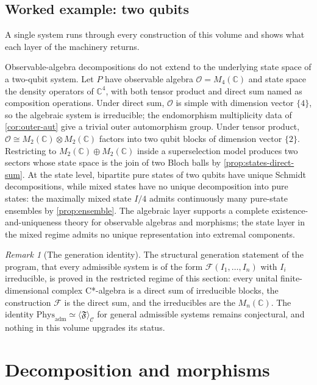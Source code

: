 \documentclass[11pt,letterpaper]{article}
\theoremstyle{definition}
\theoremstyle{remark}
\newtheorem{remark}[theorem]{Remark}
\begin{document}
\subsection{Worked example: two qubits}

A single system runs through every construction of this volume and shows what each layer of the machinery returns.

Observable-algebra decompositions do not extend to the underlying state space of a two-qubit system. Let $P$ have observable algebra $\mathcal{O} = M_4(\mathbb{C})$ and state space the density operators of $\mathbb{C}^4$, with both tensor product and direct sum named as composition operations. Under direct sum, $\mathcal{O}$ is simple with dimension vector $\{4\}$, so the algebraic system is irreducible; the endomorphism multiplicity data of \cref{cor:outer-aut} give a trivial outer automorphism group. Under tensor product, $\mathcal{O} \cong M_2(\mathbb{C}) \otimes M_2(\mathbb{C})$ factors into two qubit blocks of dimension vector $\{2\}$. Restricting to $M_2(\mathbb{C}) \oplus M_2(\mathbb{C})$ inside a superselection model produces two sectors whose state space is the join of two Bloch balls by \cref{prop:states-direct-sum}. At the state level, bipartite pure states of two qubits have unique Schmidt decompositions, while mixed states have no unique decomposition into pure states: the maximally mixed state $I/4$ admits continuously many pure-state ensembles by \cref{prop:ensemble}. The algebraic layer supports a complete existence-and-uniqueness theory for observable algebras and morphisms; the state layer in the mixed regime admits no unique representation into extremal components.

\begin{remark}[The generation identity]
The structural generation statement of the program, that every admissible system is of the form $\mathcal{F}(I_1, \dots, I_n)$ with $I_i$ irreducible, is proved in the restricted regime of this section: every unital finite-dimensional complex C*-algebra is a direct sum of irreducible blocks, the construction $\mathcal{F}$ is the direct sum, and the irreducibles are the $M_n(\mathbb{C})$. The identity $\mathrm{Phys}_{\mathrm{adm}} \simeq \langle \mathfrak{F} \rangle_{\mathcal{C}}$ for general admissible systems remains conjectural, and nothing in this volume upgrades its status.
\end{remark}

\section{Decomposition and morphisms}
\end{document}
